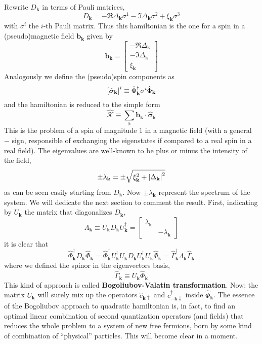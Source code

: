 Rewrite $D_\mathbf{k}$ in terms of Pauli matrices,
\[
	D_\mathbf{k} = - \Re{\Delta_\mathbf{k}} \sigma^1 - \Im{\Delta_\mathbf{k}} \sigma^2 + \xi_\mathbf{k} \sigma^3
\]
with $\sigma^i$ the $i$-th Pauli matrix. Thus this hamiltonian is the one for a spin in a (pseudo)magnetic field $\mathbf{b}_\mathbf{k}$ given by
\[
	\mathbf{b}_\mathbf{k} = \begin{bmatrix}
		- \Re{\Delta_\mathbf{k}} \\ - \Im{\Delta_\mathbf{k}} \\ \xi_\mathbf{k}
	\end{bmatrix}
\]
Analogously we define the (pseudo)spin components as
\[
	\left[{\hat{\bm{\sigma}}_\mathbf{k}}\right]^i \equiv \hat{\Phi}_\mathbf{k}^\dagger \sigma^i \hat{\Phi}_\mathbf{k}
\]
and the hamiltonian is reduced to the simple form
\[
	\hat{\mathcal{K}} \equiv \sum_\mathbb{k} \mathbf{b}_\mathbf{k} \cdot \hat{\bm{\sigma}}_\mathbf{k}
\]
This is the problem of a spin of magnitude $1$ in a magnetic field (with a general $-$ sign, responsible of exchanging the eigenstates if compared to a real spin in a real field). The eigenvalues are well-known to be plus or minus the intensity of the field,
\[
	\pm \lambda_\mathbf{k} = \pm \sqrt{\xi_\mathbf{k}^2 + \abs{\Delta_\mathbf{k}}^2}
\]
as can be seen easily starting from $D_\mathbf{k}$.
Now $\pm \lambda_\mathbf{k}$ represent the spectrum of the system. We will dedicate the next section to comment the result. First, indicating by $U_\mathbf{k}$ the matrix that diagonalizes $D_\mathbf{k}$,
\[
	\Lambda_\mathbf{k} \equiv
	U_\mathbf{k} D_\mathbf{k} U_\mathbf{k}^\dagger = \begin{bmatrix}
		\lambda_\mathbf{k} & \\
		& -\lambda_\mathbf{k}
	\end{bmatrix}
\]
it is clear that
\[
	\hat{\Phi}_\mathbf{k}^\dagger D_\mathbf{k} \hat{\Phi}_\mathbf{k} = \hat{\Phi}_\mathbf{k}^\dagger U_\mathbf{k}^\dagger U_\mathbf{k} D_\mathbf{k} U_\mathbf{k}^\dagger U_\mathbf{k} \hat{\Phi}_\mathbf{k} = \hat{\Gamma}_\mathbf{k}^\dagger \Lambda_\mathbf{k} \hat{\Gamma}_\mathbf{k}
\]
where we defined the spinor in the eigenvectors basis,
\[
	\hat{\Gamma}_\mathbf{k} \equiv U_\mathbf{k} \hat{\Phi}_\mathbf{k}
\]
This kind of approach is called \textbf{Bogoliubov-Valatin transformation}.
Now: the matrix $U_\mathbf{k}$ will surely mix up the operators $\hat{c}_{\mathbf{k}\uparrow}$ and $\hat{c}_{-\mathbf{k}\downarrow}^\dagger$ inside $\hat{\Phi}_\mathbf{k}$. The essence of the Bogoliubov approach to quadratic hamiltonian is, in fact, to find an optimal linear combination of second quantization operators (and fields) that reduces the whole problem to a system of new free fermions, born by some kind of combination of ``physical'' particles. This will become clear in a moment.

